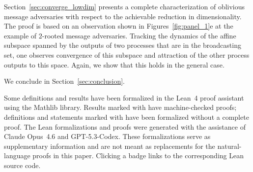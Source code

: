 \documentclass[a4paper,USenglish]{lipics-v2021}
\begin{document}
Section~\ref{sec:converge_lowdim} presents a complete characterization of oblivious message adversaries with respect to the achievable reduction in dimensionality.
The proof is based on an observation shown in Figures~\ref{fig:panel_1}e at the example of $2$-rooted message adversaries.
Tracking the dynamics of the affine subspace spanned by the outputs of two processes that are in the broadcasting set, one observes convergence of this subspace and attraction of the other process outputs to this space.
Again, we show that this holds in the general case.

We conclude in Section~\ref{sec:conclusion}.

Some definitions and results have been formalized in the Lean~4 proof assistant~\cite{lean4} using the Mathlib library.
Results marked with \leanproof{} have machine-checked proofs; definitions and statements marked with \leanformalized{} have been formalized without a complete proof.
The Lean formalizations and proofs were generated with the assistance of Claude Opus~4.6 and GPT-5.3-Codex.
These formalizations serve as supplementary information and are not meant as replacements for the natural-language proofs in this paper.
Clicking a badge links to the corresponding Lean source code.
\end{document}
